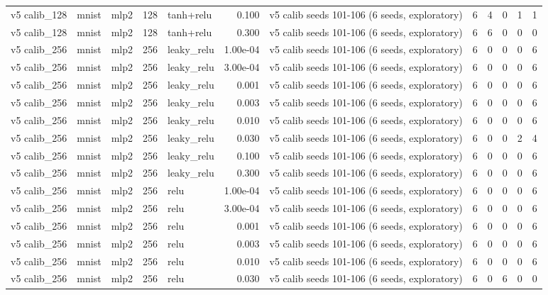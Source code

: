 \begin{table}[htbp]
{\begin{tabular}{@{}lllrlrlrrrrr@{}}
v5 calib\_128 & mnist & mlp2 & 128 & tanh+relu & 0.100 & v5 calib seeds 101-106 (6 seeds, exploratory) & 6 & 4 & 0 & 1 & 1 \\
v5 calib\_128 & mnist & mlp2 & 128 & tanh+relu & 0.300 & v5 calib seeds 101-106 (6 seeds, exploratory) & 6 & 6 & 0 & 0 & 0 \\
v5 calib\_256 & mnist & mlp2 & 256 & leaky\_relu & 1.00e-04 & v5 calib seeds 101-106 (6 seeds, exploratory) & 6 & 0 & 0 & 0 & 6 \\
v5 calib\_256 & mnist & mlp2 & 256 & leaky\_relu & 3.00e-04 & v5 calib seeds 101-106 (6 seeds, exploratory) & 6 & 0 & 0 & 0 & 6 \\
v5 calib\_256 & mnist & mlp2 & 256 & leaky\_relu & 0.001 & v5 calib seeds 101-106 (6 seeds, exploratory) & 6 & 0 & 0 & 0 & 6 \\
v5 calib\_256 & mnist & mlp2 & 256 & leaky\_relu & 0.003 & v5 calib seeds 101-106 (6 seeds, exploratory) & 6 & 0 & 0 & 0 & 6 \\
v5 calib\_256 & mnist & mlp2 & 256 & leaky\_relu & 0.010 & v5 calib seeds 101-106 (6 seeds, exploratory) & 6 & 0 & 0 & 0 & 6 \\
v5 calib\_256 & mnist & mlp2 & 256 & leaky\_relu & 0.030 & v5 calib seeds 101-106 (6 seeds, exploratory) & 6 & 0 & 0 & 2 & 4 \\
v5 calib\_256 & mnist & mlp2 & 256 & leaky\_relu & 0.100 & v5 calib seeds 101-106 (6 seeds, exploratory) & 6 & 0 & 0 & 0 & 6 \\
v5 calib\_256 & mnist & mlp2 & 256 & leaky\_relu & 0.300 & v5 calib seeds 101-106 (6 seeds, exploratory) & 6 & 0 & 0 & 0 & 6 \\
v5 calib\_256 & mnist & mlp2 & 256 & relu & 1.00e-04 & v5 calib seeds 101-106 (6 seeds, exploratory) & 6 & 0 & 0 & 0 & 6 \\
v5 calib\_256 & mnist & mlp2 & 256 & relu & 3.00e-04 & v5 calib seeds 101-106 (6 seeds, exploratory) & 6 & 0 & 0 & 0 & 6 \\
v5 calib\_256 & mnist & mlp2 & 256 & relu & 0.001 & v5 calib seeds 101-106 (6 seeds, exploratory) & 6 & 0 & 0 & 0 & 6 \\
v5 calib\_256 & mnist & mlp2 & 256 & relu & 0.003 & v5 calib seeds 101-106 (6 seeds, exploratory) & 6 & 0 & 0 & 0 & 6 \\
v5 calib\_256 & mnist & mlp2 & 256 & relu & 0.010 & v5 calib seeds 101-106 (6 seeds, exploratory) & 6 & 0 & 0 & 0 & 6 \\
v5 calib\_256 & mnist & mlp2 & 256 & relu & 0.030 & v5 calib seeds 101-106 (6 seeds, exploratory) & 6 & 0 & 6 & 0 & 0 \\

\end{tabular}}
\end{table}
